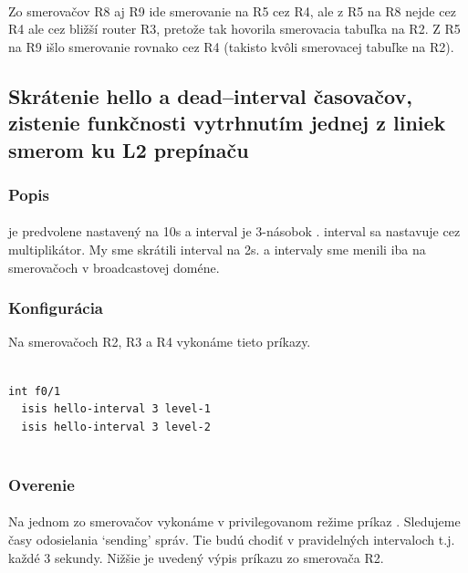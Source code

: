 \documentclass[12pt,twoside,a4paper]{report}
\begin{document}
\paragraph{}
Zo smerovačov R8 aj R9 ide smerovanie na R5 cez R4, ale z R5 na R8 nejde cez R4 ale cez bližší router R3, pretože tak hovorila smerovacia tabuľka na R2. Z R5 na R9 išlo smerovanie rovnako cez R4 (takisto kvôli smerovacej tabuľke na R2).





\subsection{Skrátenie hello a dead–interval časovačov, zistenie funkčnosti vytrhnutím jednej z liniek smerom ku L2 prepínaču}
\subsubsection{Popis}
\paragraph{}
 je predvolene nastavený na 10s a  interval je 3-násobok .  interval sa nastavuje cez multiplikátor. My sme skrátili  interval na 2s.  a  intervaly sme menili iba na smerovačoch v broadcastovej doméne.


\subsubsection{Konfigurácia}
Na smerovačoch R2, R3 a R4 vykonáme tieto príkazy.

\noindent
{\selectfont
\begin{small}
\begin{verbatim}

int f0/1
  isis hello-interval 3 level-1
  isis hello-interval 3 level-2


\end{verbatim}
\end{small}
}

\subsubsection{Overenie}
\paragraph{}
Na jednom zo smerovačov vykonáme v privilegovanom režime príkaz . Sledujeme časy odosielania ‘sending’ správ. Tie budú chodiť v pravidelných intervaloch t.j. každé 3 sekundy. Nižšie je uvedený výpis príkazu  zo smerovača R2.
\end{document}
